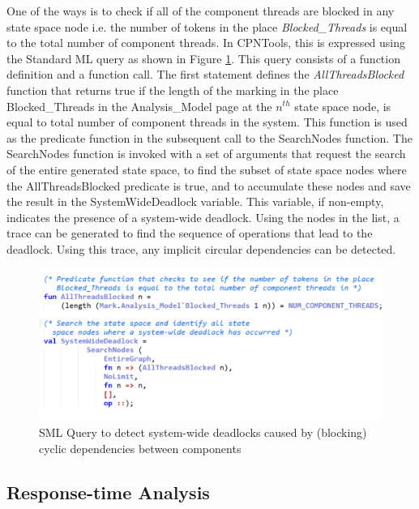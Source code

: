 One of the ways is to check if all of the component threads are blocked in any state space node i.e. the number of tokens in the place \emph{Blocked\_Threads} is equal to the total number of component threads. In CPNTools, this is expressed using the Standard ML query as shown in Figure \ref{fig:blocked_threads}. This query consists of a function definition and a function call. The first statement defines the \emph{AllThreadsBlocked} function that returns true if the length of the marking in the place Blocked\_Threads in the Analysis\_Model page at the $n^{th}$ state space node, is equal to total number of component threads in the system. This function is used as the predicate function in the subsequent call to the SearchNodes function. The SearchNodes function is invoked with a set of arguments that request the search of the entire generated state space, to find the subset of state space nodes where the AllThreadsBlocked predicate is true, and to accumulate these nodes and save the result in the SystemWideDeadlock variable. This variable, if non-empty, indicates the presence of a system-wide deadlock. Using the nodes in the list, a trace can be generated to find the sequence of operations that lead to the deadlock. Using this trace, any implicit circular dependencies can be detected. 

\begin{figure}[htb]
	\centering
	\includegraphics[width=\textwidth]{./img/blocked_threads.png}
	\caption{SML Query to detect system-wide deadlocks caused by (blocking) cyclic dependencies between components}
	\label{fig:blocked_threads}
\end{figure}
\FloatBarrier

\subsection{Response-time Analysis}

